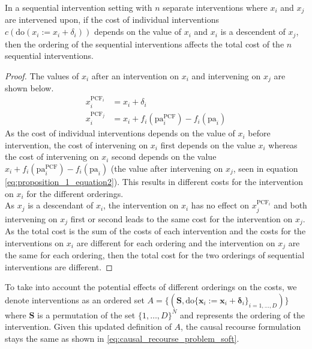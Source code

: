 \begin{proposition} \label{sequential_proposition}
	In a sequential intervention setting with $n$ separate interventions where $x_i$ and $x_j$ are intervened upon, if the cost of individual interventions $c(\text{do}(x_i:=x_i + \delta_i))$ depends on the value of $x_i$ and $x_i$ is a descendent of $x_j$, then the ordering of the sequential interventions affects the total cost of the $n$ sequential interventions.
\end{proposition}
\bigskip
\begin{proof}
	The values of $x_i$ after an intervention on $x_i$ and intervening on $x_j$ are shown below.
	\begin{align} \label{eq:proposition_1_equation}
		x^{\text{PCF}_i}_i & = x_i + \delta_i \\ \label{eq:proposition_1_equation2}
		x^{\text{PCF}_j}_i & = x_i + f_i(\text{pa}^{\text{PCF}}_i) - f_i(\text{pa}_i)
	\end{align}
	As the cost of individual interventions depends on the value of $x_i$ before intervention, the cost of intervening on $x_i$ first depends on the value $x_i$ whereas the cost of intervening on $x_i$ second depends on the value $x_i + f_i(\text{pa}^{\text{PCF}}_i) - f_i(\text{pa}_i)$ (the value after intervening on $x_j$, seen in equation \ref{eq:proposition_1_equation2}). This results in different costs for the intervention on $x_i$ for the different orderings.\\
	
	As $x_j$ is a descendant of $x_i$, the intervention on $x_i$ has no effect on $x^{\text{PCF}_i}_j$ and both intervening on $x_j$ first or second leads to the same cost for the intervention on $x_j$.\\
	
	As the total cost is the sum of the costs of each intervention and the costs for the interventions on $x_i$ are different for each ordering and the intervention on $x_j$ are the same for each ordering, then the total cost for the two orderings of sequential interventions are different.
\end{proof}
\bigskip
To take into account the potential effects of different orderings on the costs, we denote interventions as an ordered set $A = \big\{(\mathbf{S}, \text{do} \{\mathbf{x}_i:=\mathbf{x}_i + \boldsymbol{\delta}_i\}_{i=1, \ldots, D})\big\}$ where $\mathbf{S}$ is a permutation of the set $\{1, \ldots, D\}^N$ and represents the ordering of the intervention. Given this updated definition of $A$, the causal recourse formulation stays the same as shown in \ref{eq:causal_recourse_problem_soft}.\\


